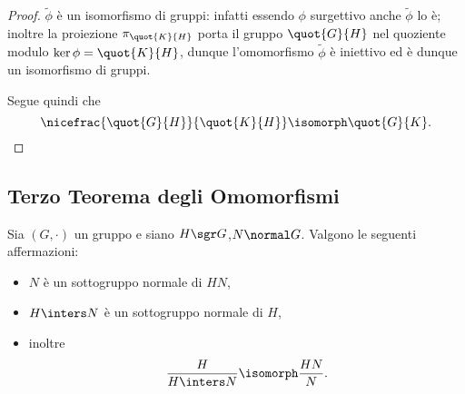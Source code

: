 \begin{proof}
    $\widetilde{\phi}$ è un isomorfismo di gruppi: infatti essendo $\phi$ surgettivo anche $\widetilde{\phi}$ lo è; inoltre la proiezione $\pi_{\quot{K}{H}}$ porta il gruppo $\quot{G}{H}$ nel quoziente modulo $\ker \phi = \quot{K}{H}$, dunque l'omomorfismo $\widetilde{\phi}$ è iniettivo ed è dunque un isomorfismo di gruppi.

    Segue quindi che \[
        \nicefrac{\quot{G}{H}}{\quot{K}{H}} \isomorph \quot{G}{K}. \qedhere 
    \]
\end{proof}

\subsection{Terzo Teorema degli Omomorfismi}
\begin{theorem}
     Sia $(G, \cdot)$ un gruppo e siano $H \sgr G$,$N \normal G$. 
    Valgono le seguenti affermazioni: \begin{itemize}
        \item $N$ è un sottogruppo normale di $HN$,
        \item $H \inters N$ è un sottogruppo normale di $H$,
        \item inoltre \begin{equation}
            \frac{H}{H \inters N} \isomorph \frac{HN}{N}.
        \end{equation}
    \end{itemize}
\end{theorem}
